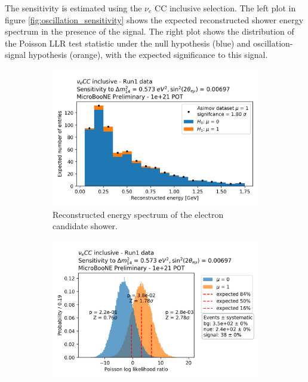 \documentclass[a4paper]{article}
\newcommand{\nuecc}{$\nu_e$ CC\xspace}
\begin{document}
The sensitivity is estimated using the \nuecc inclusive selection.
The left plot in figure \ref{fig:oscillation_sensitivity} shows the expected reconstructed shower energy spectrum in the presence of the signal.
The right plot shows the distribution of the Poisson LLR test statistic under the null hypothesis (blue) and oscillation-signal hypothesis (orange), with the expected significance to this signal.

\begin{figure}[ht] 
\begin{center}
    \begin{subfigure}[b]{0.45\textwidth}
    \centering
    \includegraphics[width=1.00\textwidth]{Sensitivity/oscillation/pois_llr_asimov_plot_1e+21_deltam2_0573_sin2theta2_000697.png}
    \caption{Reconstructed energy spectrum of the electron candidate shower.}
    \end{subfigure}
    \begin{subfigure}[b]{0.45\textwidth}
    \centering
    \includegraphics[width=1.00\textwidth]{Sensitivity/oscillation/pois_llr_discovery_totalpot_1e+21_nosyst_deltam2_0573_sin2theta2_000697.png}

\end{subfigure}
\end{center}
\end{figure}
\end{document}
